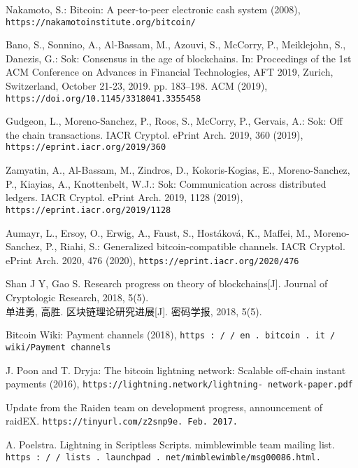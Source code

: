 \documentclass[review]{jcr}
\begin{document}
\begin{thebibliography}{10}
\providecommand{\url}[1]{\texttt{#1}}
\providecommand{\urlprefix}{URL }

Nakamoto, S.: Bitcoin: A peer-to-peer electronic cash system (2008),
  \url{https://nakamotoinstitute.org/bitcoin/}

Bano, S., Sonnino, A., Al{-}Bassam, M., Azouvi, S., McCorry, P., Meiklejohn,
  S., Danezis, G.: Sok: Consensus in the age of blockchains. In: Proceedings of
  the 1st {ACM} Conference on Advances in Financial Technologies, {AFT} 2019,
  Zurich, Switzerland, October 21-23, 2019. pp. 183--198. {ACM} (2019),
  \url{https://doi.org/10.1145/3318041.3355458}

Gudgeon, L., Moreno{-}Sanchez, P., Roos, S., McCorry, P., Gervais, A.: Sok: Off
  the chain transactions. {IACR} Cryptol. ePrint Arch.  2019,  360 (2019),
  \url{https://eprint.iacr.org/2019/360}

Zamyatin, A., Al{-}Bassam, M., Zindros, D., Kokoris{-}Kogias, E.,
  Moreno{-}Sanchez, P., Kiayias, A., Knottenbelt, W.J.: Sok: Communication
  across distributed ledgers. {IACR} Cryptol. ePrint Arch.  2019,  1128 (2019),
  \url{https://eprint.iacr.org/2019/1128}

Aumayr, L., Ersoy, O., Erwig, A., Faust, S., Host{\'{a}}kov{\'{a}}, K., Maffei,
  M., Moreno{-}Sanchez, P., Riahi, S.: Generalized bitcoin-compatible channels.
  {IACR} Cryptol. ePrint Arch.  2020,  476 (2020),
  \url{https://eprint.iacr.org/2020/476}

Shan J Y, Gao S. Research progress on theory of blockchains[J]. Journal of Cryptologic Research, 2018, 5(5).\\
单进勇, 高胜. 区块链理论研究进展[J]. 密码学报, 2018, 5(5).

Bitcoin Wiki: Payment channels  (2018), \url{https : / / en . bitcoin . it /
  wiki/Payment channels}

J. Poon and T. Dryja: The bitcoin lightning network: Scalable off-chain
  instant payments  (2016), \url{https://lightning.network/lightning-
  network-paper.pdf}

Update from the Raiden team on development progress, announcement of raidEX. \url{https://tinyurl.com/z2snp9e. Feb. 2017.}

A. Poelstra. Lightning in Scriptless Scripts. mimblewimble team mailing list. \url{https : / / lists . launchpad . net/mimblewimble/msg00086.html.}


\end{thebibliography}
\end{document}
